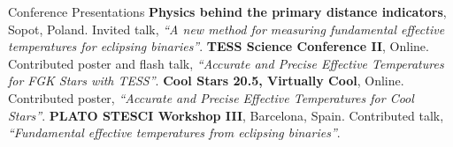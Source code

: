 \begin{rubric}{Conference Presentations}
\entry*[2021]%
	\textbf{Physics behind the primary distance indicators}, Sopot, Poland. Invited talk, \textit{``A new method for measuring fundamental effective temperatures for eclipsing binaries''}.
\entry*[2021]%
	\textbf{TESS Science Conference II}, Online. Contributed poster and flash talk, \textit{``Accurate and Precise Effective Temperatures for FGK Stars with TESS''}. 
\entry*[2021]%
	\textbf{Cool Stars 20.5, Virtually Cool}, Online. Contributed poster, \textit{``Accurate and Precise Effective Temperatures for Cool Stars''}. 
\entry*[2019]%
	\textbf{PLATO STESCI Workshop III}, Barcelona, Spain. Contributed talk, \textit{``Fundamental effective temperatures from eclipsing binaries''}.  
%
%
%
%
\end{rubric}